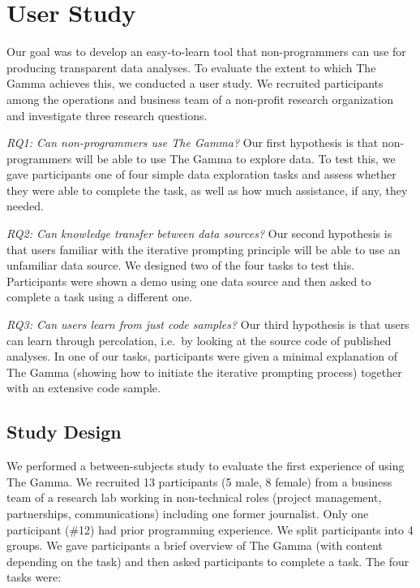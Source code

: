 \documentclass[manuscript,review,anonymous]{acmart}
\begin{document}
\section{User Study}
\label{sec:study}

Our goal was to develop an easy-to-learn tool that non-programmers can use
for producing transparent data analyses. To evaluate the extent to which The Gamma achieves this,
we conducted a user study. We recruited participants among the operations and business team of a
non-profit research organization and investigate three research questions.

\vspace{0.5em}\noindent\emph{RQ1: Can non-programmers use The Gamma?}\hspace{0.3em}
Our first hypothesis is that non-programmers will be able to use The Gamma to explore data. To test
this, we gave participants one of four simple data exploration tasks and assess whether they were
able to complete the task, as well as how much assistance, if any, they needed.

\vspace{0.5em}\noindent\emph{RQ2: Can knowledge transfer between data sources?}\hspace{0.3em}
Our second hypothesis is that users familiar with the iterative prompting principle will be able to
use an unfamiliar data source. We designed two of the four tasks to test this. Participants were
shown a demo using one data source and then asked to complete a task using a different one.

\vspace{0.5em}\noindent\emph{RQ3: Can users learn from just code samples?}\hspace{0.3em}
Our third hypothesis is that users can learn through percolation, i.e.~by looking at the source
code of published analyses. In one of our tasks, participants were given a minimal explanation
of The Gamma (showing how to initiate the iterative prompting process) together with
an extensive code sample.

\subsection{Study Design}
We performed a between-subjects study to evaluate the first experience of using The Gamma.
We recruited 13 participants (5 male, 8 female) from a business team
of a research lab working in non-technical roles (project management,
partnerships, communications) including one former journalist. Only one participant (\#12)
had prior programming experience. We split participants into 4 groups. We gave participants a
brief overview of The Gamma (with content depending on the task) and then asked participants
to complete a task. The four tasks were:
\end{document}
